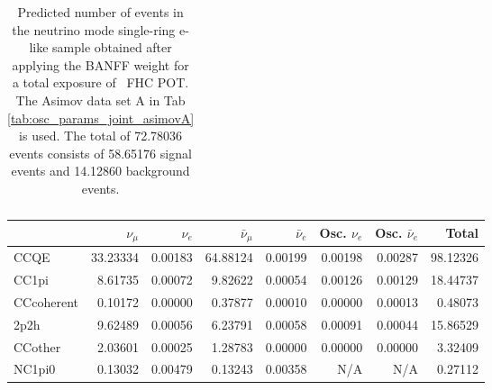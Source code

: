 \begin{table}
\begin{tabular} { | l ||r | r | r | r | r | r | | r | }
	\end{tabular}
	\caption{Predicted number of events in the neutrino mode single-ring e-like sample obtained after applying the BANFF weight for a total exposure of \TotalPotNuRunOneNine\ FHC POT. The Asimov data set A in Tab \ref{tab:osc_params_joint_asimovA} is used. The total of 72.78036 events consists of 58.65176 signal events and 14.12860 background events.}
	\label{tab:event_rates_exp_1Re_Run1-9d}
\end{table}
%
%
%
%
%
%
%
%
%
%
%

\begin{table}
	\centering
	\begin{tabular} { | l ||r | r | r | r | r | r | | r | }
	\hline
	              & $\nu_\mu$            & $\nu_e$              & $\bar{\nu}_{\mu}$    & $\bar{\nu}_{e}$      & Osc. $\nu_e$         & Osc. $\bar{\nu}_{e}$ & Total                \\ \hline\hline
	 CCQE         & 33.23334             & 0.00183              & 64.88124             & 0.00199              & 0.00198              & 0.00287              & 98.12326             \\ \hline
	 CC1pi        & 8.61735              & 0.00072              & 9.82622              & 0.00054              & 0.00126              & 0.00129              & 18.44737             \\ \hline
	 CCcoherent   & 0.10172              & 0.00000              & 0.37877              & 0.00010              & 0.00000              & 0.00013              & 0.48073              \\ \hline
	 2p2h         & 9.62489              & 0.00056              & 6.23791              & 0.00058              & 0.00091              & 0.00044              & 15.86529             \\ \hline
	 CCother      & 2.03601              & 0.00025              & 1.28783              & 0.00000              & 0.00000              & 0.00000              & 3.32409              \\ \hline
	 NC1pi0       & 0.13032              & 0.00479              & 0.13243              & 0.00358              & N/A                  & N/A                  & 0.27112              \\ \hline

\end{tabular}
\end{table}
